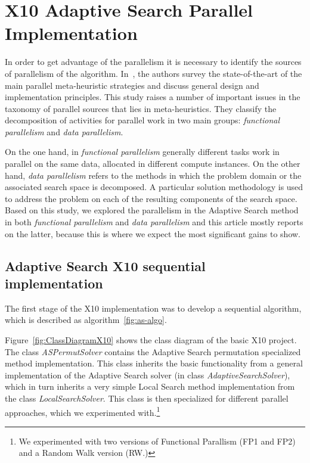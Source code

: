 \documentclass{llncs}
\begin{document}
\section{ X10 Adaptive Search Parallel Implementation}
\label{sec:X10parallel}

In order to get advantage of the parallelism it is necessary to identify
the sources of parallelism of the algorithm.  In~\cite{Crainic2010},
the authors survey the state-of-the-art of the main parallel
meta-heuristic strategies and discuss general design and
implementation principles.  This study raises a number of important
issues in the taxonomy of parallel sources that lies in
meta-heuristics. They classify the decomposition of activities for
parallel work in two main groups: \emph{functional parallelism} and
\emph{data parallelism}.

On the one hand, in \emph{functional parallelism} generally different
tasks work in parallel on the same data, allocated in different
compute instances. On the other hand, \emph{data parallelism} refers
to the methods in which the problem domain or the associated search
space is decomposed. A particular solution methodology is used to
address the problem on each of the resulting components of the search
space.  Based on this study, we explored the parallelism in the
Adaptive Search method in both \emph{functional parallelism} and
\emph{data parallelism} and this article mostly reports on the latter,
because this is where we expect the most significant gains to show.

\subsection{Adaptive Search X10 sequential implementation}

The first stage of the X10 implementation was to develop a sequential
algorithm, which is described as algorithm~\ref{fig:as-algo}.

Figure~\ref{fig:ClassDiagramX10} shows the class diagram of the basic
X10 project. The class \emph{ASPermutSolver} contains the Adaptive
Search permutation specialized method implementation. This class
inherits the basic functionality from a general implementation of the
Adaptive Search solver (in class \emph{AdaptiveSearchSolver}), which
in turn inherits a very simple Local Search method implementation from
the class \emph{LocalSearchSolver}.  This class is then specialized
for different parallel approaches, which we experimented
with.\footnote{We experimented with two versions of Functional
  Parallism (FP1 and FP2) and a Random Walk version (RW.)}
\end{document}

